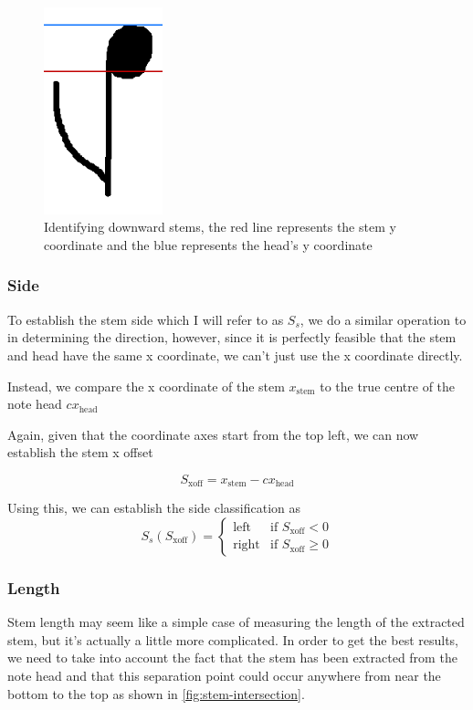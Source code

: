 \begin{figure}[h!]
    \quad
    \includegraphics[height=6cm]{gfx/techniques/scoring/note-stem-down/6090.png}

    \caption{Identifying downward stems, the red line represents the stem y  coordinate and the blue represents the head's y coordinate}
    \label{fig:downward-stem-identification}
\end{figure}

\subsubsection{Side}
To establish the stem side which I will refer to as $S_s$, we do a similar operation to in determining the direction, however, since it is perfectly feasible that the stem and head have the same x coordinate, we can't just use the x coordinate directly.

Instead, we compare the x coordinate of the stem $x_{\text{stem}}$ to the true centre  of the note head $cx_{\text{head}}$

Again, given that the coordinate axes start from the top left, we can now establish the stem x offset

$$
S_\text{xoff} = x_{\text{stem}} - cx_{\text{head}}
$$

Using this, we can establish the side classification as
$$
S_{s} (S_\text{xoff}) =
\left\{
	\begin{array}{ll}
		\text{left}   & \mbox{if } S_\text{xoff} < 0 \\
		\text{right}  & \mbox{if } S_\text{xoff} \ge 0
	\end{array}
\right.
$$

\subsubsection{Length}

Stem length may seem like a simple case of measuring the length of the extracted stem, but it's actually a little more complicated. In order to get the best results, we need to take into account the fact that the stem has been extracted from the note head and that this separation point could occur anywhere from near the bottom to the top as shown in \cref{fig:stem-intersection}.


